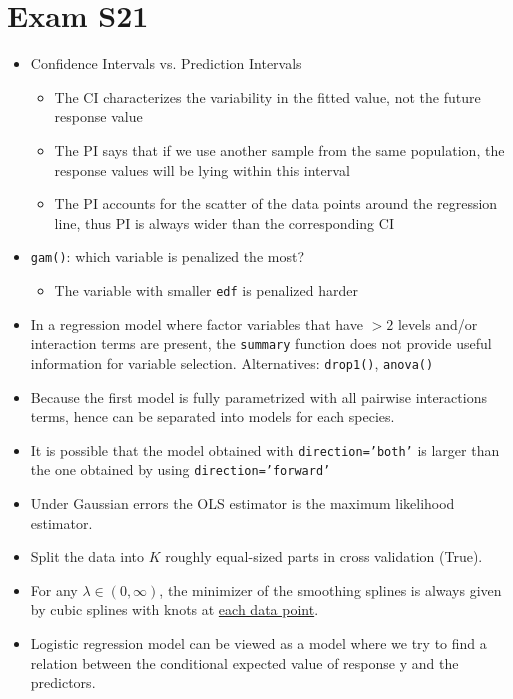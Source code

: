 \documentclass[a4paper]{article}
\begin{document}
\section{Exam S21}
\begin{itemize}
    \item Confidence Intervals vs. Prediction Intervals
    \begin{itemize}
        \item The CI characterizes the variability in the fitted value, not the future response value
        \item The PI says that if we use another sample from the same population, the response values will be lying within this interval
        \item The PI accounts for the scatter of the data points around the regression line, thus PI is always wider than the corresponding CI
    \end{itemize}
    \item \texttt{gam()}: which variable is penalized the most?
    \begin{itemize}
        \item The variable with smaller \texttt{edf} is penalized harder
    \end{itemize}
    \item In a regression model where factor variables that have $>2$ levels and/or interaction terms are present, the \texttt{summary} function does not provide useful information for variable selection. Alternatives: \texttt{drop1()}, \texttt{anova()}
    \item Because the first model is fully parametrized with all pairwise interactions terms, hence can be separated into models for each species.
    \item It is possible that the model obtained with \texttt{direction='both'} is larger than the one obtained by using \texttt{direction='forward'}
    \item Under Gaussian errors the OLS estimator is the maximum likelihood estimator.
    \item Split the data into $K$ roughly equal-sized parts in cross validation (True).
    \item For any $\lambda\in(0,\infty)$, the minimizer of the smoothing splines is always given by cubic splines with knots at \underline{each data point}.
    \item Logistic regression model can be viewed as a model where we try to find a relation between the conditional expected value of response y and the predictors.
\end{itemize}
\end{document}
